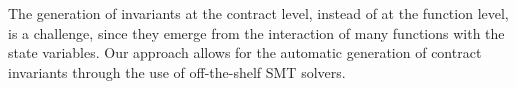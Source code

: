 The generation of invariants at the contract level, instead of at the function level, is a challenge, since they emerge from the interaction of many functions with the state variables. Our approach allows for the automatic generation of contract invariants through the use of off-the-shelf SMT solvers.

%
%
%
%
